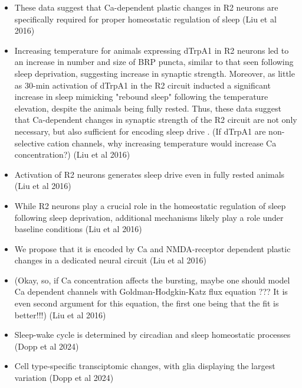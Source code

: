 \documentclass[11pt]{article}
\begin{document}
\begin{itemize}
    \item These data suggest that Ca-dependent plastic changes in R2 neurons are specifically required for proper
    homeostatic regulation of sleep \cite{liuSleepDriveEncoded2016}
    (Liu et al 2016)

    \item Increasing temperature for animals expressing dTrpA1 in R2 neurons led to an increase in number and size of
    BRP puncta, similar to that seen following sleep deprivation, suggesting increase in synaptic strength. Moreover, as
    little as 30-min activation of dTrpA1 in the R2 circuit inducted a significant increase in sleep mimicking "rebound sleep"
    following the temperature elevation, despite the animals being fully rested. Thus, these data suggest that
    Ca-dependent changes in synaptic strength of the R2 circuit are not only necessary, but also sufficient for
    encoding sleep drive \cite{liuSleepDriveEncoded2016}. (If dTrpA1 are non-selective cation channels, why
    increasing temperature would increase Ca concentration?)
    (Liu et al 2016)

    \item Activation of R2 neurons generates sleep drive even in fully rested animals \cite{liuSleepDriveEncoded2016}
    (Liu et al 2016)

    \item While R2 neurons play a crucial role in the homeostatic regulation of sleep following sleep deprivation,
    additional mechanisms likely play a role under baseline conditions \cite{liuSleepDriveEncoded2016}
    (Liu et al 2016)

    \item We propose that it is encoded by Ca and NMDA-receptor dependent plastic changes in a dedicated neural circuit \cite{liuSleepDriveEncoded2016}
    (Liu et al 2016)

    \item (Okay, so, if Ca concentration affects the bursting, maybe one should model Ca dependent channels with
    Goldman-Hodgkin-Katz flux equation ??? It is even second argument for this equation, the first one being that
    the fit is better!!!)
    (Liu et al 2016)

    \item Sleep-wake cycle is determined by circadian and sleep homeostatic processes \cite{doppSinglecellTranscriptomicsReveals2024}
    (Dopp et al 2024)

    \item Cell type-specific transciptomic changes, with glia displaying the largest variation \cite{doppSinglecellTranscriptomicsReveals2024}
    (Dopp et al 2024)


\end{itemize}
\end{document}
